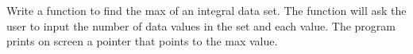 \documentclass[11pt,fleqn]{book} %
\begin{document}
\begin{problem}
  Write a function to find the max of an integral data set. The function will ask the user to input the number of data values in the set and each value. The program prints on screen a pointer that points to the max value.
\end{problem}







\end{document}
